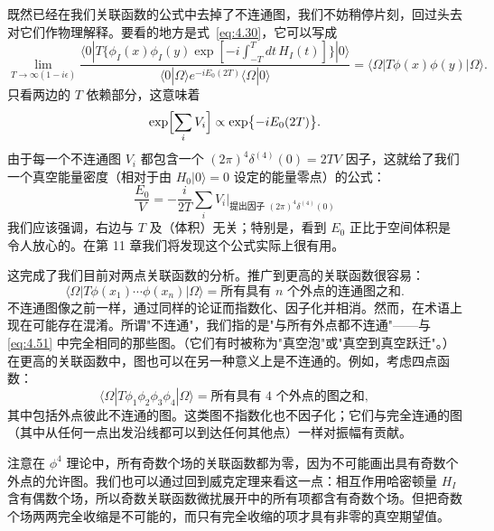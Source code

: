 既然已经在我们关联函数的公式中去掉了不连通图，我们不妨稍停片刻，回过头去对它们作物理解释。要看的地方是式~\eqref{eq:4.30}，它可以写成
\begin{equation}
  \lim_{T\to\infty(1-i\epsilon)}
    \frac{\langle 0|T\bigl\{ \phi_I(x)\phi_I(y)
      \exp[-i\int_{-T}^{T}dt\,H_I(t)]\bigr\}|0\rangle}
      {\langle 0|\Omega\rangle e^{-iE_0(2T)}\langle\Omega|0\rangle}
  = \langle\Omega|T\phi(x)\phi(y)|\Omega\rangle .
\end{equation}
只看两边的 $T$ 依赖部分，这意味着
\begin{equation}
  \exp\Bigl[ \sum_i V_i \Bigr] \propto \exp\bigl\{ -iE_0(2T) \bigr\} .
  \label{eq:4.55}
\end{equation}
由于每一个不连通图 $V_i$ 都包含一个 $(2\pi)^4\delta^{(4)}(0) = 2TV$ 因子，这就给了我们一个真空能量密度（相对于由 $H_0|0\rangle = 0$ 设定的能量零点）的公式：
\begin{equation}
  \frac{E_0}{V} = -\frac{i}{2T}\sum_i V_i
    \Big|_{\text{提出因子 } (2\pi)^4\delta^{(4)}(0)}
  \label{eq:4.56}
\end{equation}
我们应该强调，右边与 $T$ 及（体积）无关；特别是，看到 $E_0$ 正比于空间体积是令人放心的。在第 11 章我们将发现这个公式实际上很有用。

这完成了我们目前对两点关联函数的分析。推广到更高的关联函数很容易：
\begin{equation}
  \langle\Omega|T\phi(x_1)\cdots\phi(x_n)|\Omega\rangle
  = \text{所有具有 } n \text{ 个外点的连通图之和} .
  \label{eq:4.57}
\end{equation}
不连通图像之前一样，通过同样的论证而指数化、因子化并相消。然而，在术语上现在可能存在混淆。所谓"不连通"，我们指的是"与所有外点都不连通"——与 \eqref{eq:4.51} 中完全相同的那些图。（它们有时被称为"真空泡"或"真空到真空跃迁"。）在更高的关联函数中，图也可以在另一种意义上是不连通的。例如，考虑四点函数：
\begin{equation}
  \langle\Omega|T\phi_1\phi_2\phi_3\phi_4|\Omega\rangle
  = \text{所有具有 4 个外点的图之和},
  \label{eq:4.58}
\end{equation}
其中包括外点彼此不连通的图。这类图不指数化也不因子化；它们与完全连通的图（其中从任何一点出发沿线都可以到达任何其他点）一样对振幅有贡献。

注意在 $\phi^4$ 理论中，所有奇数个场的关联函数都为零，因为不可能画出具有奇数个外点的允许图。我们也可以通过回到威克定理来看这一点：相互作用哈密顿量 $H_I$ 含有偶数个场，所以奇数关联函数微扰展开中的所有项都含有奇数个场。但把奇数个场两两完全收缩是不可能的，而只有完全收缩的项才具有非零的真空期望值。


